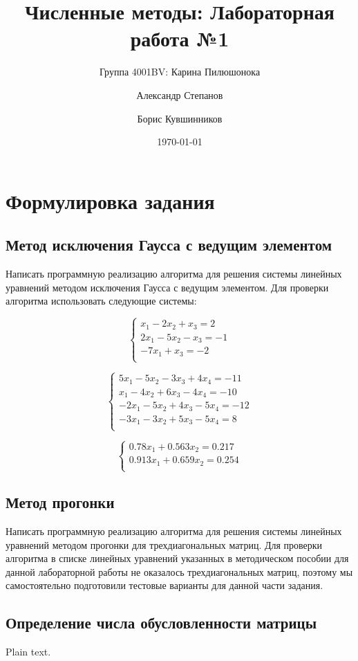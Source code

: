 \documentclass{article}
\title{Численные методы: Лабораторная работа №1}
\author{Группа 4001BV: Карина Пилюшонока \and Александр Степанов \and Борис
Кувшинников}
\date \today
\begin{document}
\maketitle
\newpage
\tableofcontents
\newpage
\section{Формулировка задания}

\subsection{Метод исключения Гаусса с ведущим элементом}
Написать программную реализацию алгоритма для решения системы линейных
уравнений методом исключения Гаусса с ведущим элементом.
Для проверки алгоритма использовать следующие системы:

\begin{equation}\label{1st}
\left\{ \begin{array}{ll}
x_{1} - 2x_{2} + x_{3} = 2\\
2x_{1} - 5x_{2} - x_{3} = -1\\
-7x_{1} + x_{3} = -2\\
\end{array} \right.
\end{equation}

\begin{equation}\label{2st}
\left\{ \begin{array}{ll}
5x_{1} - 5x_{2} - 3x_{3} + 4x_{4} = -11\\
x_{1} - 4x_{2} + 6x_{3} - 4x_{4} = -10\\
-2x_{1} - 5x_{2} + 4x_{3} - 5x_{4} = -12\\
-3x_{1} - 3x_{2} + 5x_{3} - 5x_{4} = 8\\
\end{array} \right.
\end{equation}

\begin{equation}\label{3d}
\left\{ \begin{array}{ll}
0.78x_{1} + 0.563x_{2} = 0.217\\
0.913x_{1} + 0.659x_{2} = 0.254\\
\end{array} \right.
\end{equation}

\subsection{Метод прогонки}
Написать программную реализацию алгоритма для решения системы линейных
уравнений методом прогонки для трехдиагональных матриц.
Для проверки алгоритма в списке линейных уравнений указанных в методическом
пособии для данной лабораторной работы не оказалось трехдиагональных матриц,
поэтому мы самостоятельно подготовили тестовые варианты для данной
части задания.

\subsection{Определение числа обусловленности матрицы}

Plain text.
\end{document}
